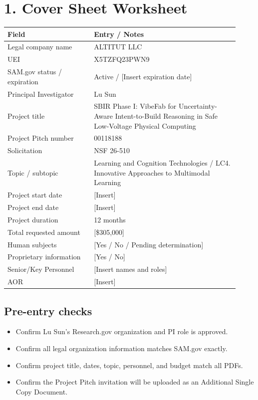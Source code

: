 \documentclass[11pt,letterpaper]{article}
\begin{document}
\section*{1. Cover Sheet Worksheet}

\begin{tabular}{p{0.34\linewidth}p{0.58\linewidth}}
\textbf{Field} & \textbf{Entry / Notes} \\
\hline
Legal company name & ALTITUT LLC \\
UEI & X5TZFQ23PWN9 \\
SAM.gov status / expiration & Active / [Insert expiration date] \\
Principal Investigator & Lu Sun \\
Project title & SBIR Phase I: VibeFab for Uncertainty-Aware Intent-to-Build Reasoning in Safe Low-Voltage Physical Computing \\
Project Pitch number & 00118188 \\
Solicitation & NSF 26-510 \\
Topic / subtopic & Learning and Cognition Technologies / LC4. Innovative Approaches to Multimodal Learning \\
Project start date & [Insert] \\
Project end date & [Insert] \\
Project duration & 12 months \\
Total requested amount & [\$305,000] \\
Human subjects & [Yes / No / Pending determination] \\
Proprietary information & [Yes / No] \\
Senior/Key Personnel & [Insert names and roles] \\
AOR & [Insert] \\
\end{tabular}

\subsection*{Pre-entry checks}
\begin{itemize}
\item Confirm Lu Sun's Research.gov organization and PI role is approved.
\item Confirm all legal organization information matches SAM.gov exactly.
\item Confirm project title, dates, topic, personnel, and budget match all PDFs.
\item Confirm the Project Pitch invitation will be uploaded as an Additional Single Copy Document.
\end{itemize}
\end{document}
